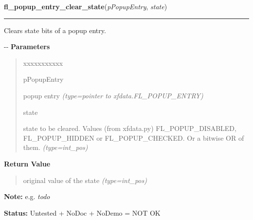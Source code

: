 \hspace{.8\funcindent}\begin{boxedminipage}{\funcwidth}

    \raggedright \textbf{fl\_popup\_entry\_clear\_state}(\textit{pPopupEntry}, \textit{state})

    \vspace{-1.5ex}

    \rule{\textwidth}{0.5\fboxrule}
\setlength{\parskip}{2ex}

Clears state bits of a popup entry.

-{}-
\setlength{\parskip}{1ex}
      \textbf{Parameters}
      \vspace{-1ex}

      \begin{quote}
        \begin{Ventry}{xxxxxxxxxxx}

          \item[pPopupEntry]


popup entry
            {\it (type=pointer to xfdata.FL\_POPUP\_ENTRY)}

          \item[state]


state to be cleared. Values (from xfdata.py) FL\_POPUP\_DISABLED,
FL\_POPUP\_HIDDEN or FL\_POPUP\_CHECKED. Or a bitwise OR of them.
            {\it (type=int\_pos)}

        \end{Ventry}

      \end{quote}

      \textbf{Return Value}
    \vspace{-1ex}

      \begin{quote}

original value of the state
      {\it (type=int\_pos)}

      \end{quote}

\textbf{Note:} 
e.g. \emph{todo}


\textbf{Status:} 
Untested + NoDoc + NoDemo = NOT OK


    \end{boxedminipage}

    \label{xformslib:flpopup:fl_popup_entry_raise_state}

